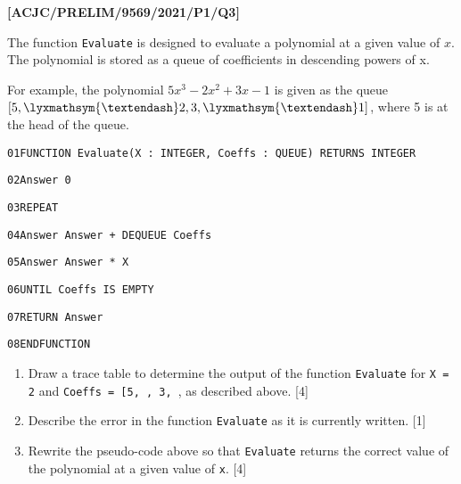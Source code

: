 \item \textbf{{[}ACJC/PRELIM/9569/2021/P1/Q3{]} }

The function \texttt{Evaluate} is designed to evaluate a polynomial
at a given value of $x$. The polynomial is stored as a queue of coefficients
in descending powers of x.

For example, the polynomial $5x^{3}-2x^{2}+3x-1$ is given as the
queue $[5,\lyxmathsym{\textendash}2,3,\lyxmathsym{\textendash}1]$,
where 5 is at the head of the queue.

\noindent %
\noindent\begin{minipage}[t]{1\columnwidth}%
\texttt{01\qquad{}FUNCTION Evaluate(X : INTEGER, Coeffs : QUEUE)
RETURNS INTEGER }

\texttt{02\qquad{}\qquad{}Answer \textleftarrow{} 0 }

\texttt{03\qquad{}\qquad{}REPEAT }

\texttt{04\qquad{}\qquad{}\qquad{}Answer \textleftarrow{} Answer
+ DEQUEUE Coeffs }

\texttt{05\qquad{}\qquad{}\qquad{}Answer \textleftarrow{} Answer
{*} X }

\texttt{06\qquad{}\qquad{}UNTIL Coeffs IS EMPTY }

\texttt{07\qquad{}\qquad{}RETURN Answer }

\texttt{08\qquad{}ENDFUNCTION}%
\end{minipage}
\begin{enumerate}
\item Draw a trace table to determine the output of the function \texttt{Evaluate}
for \texttt{X = 2} and \texttt{Coeffs = {[}5, , 3, \textendash 1{]}},
as described above. \hfill{}{[}4{]}
\item Describe the error in the function \texttt{Evaluate} as it is currently
written. \hfill{}{[}1{]}
\item Rewrite the pseudo-code above so that \texttt{Evaluate} returns the
correct value of the polynomial at a given value of \texttt{x}. \hfill{}{[}4{]}
\end{enumerate}